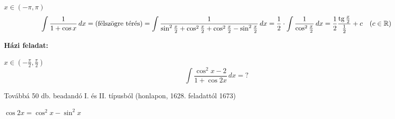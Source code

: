\documentclass[a4paper,11.5pt]{article}
\DeclareMathOperator{\tg}{tg}
\begin{document}
	\begin{task} $x\in(-\pi,\pi)$
		\[\int\frac{1}{1+\cos x}\,dx=\text{(félszögre térés)}=\int\frac{1}{\sin^2\frac{x}{2}+\cos^2\frac{x}{2}+\cos^2\frac{x}{2}-\sin^2\frac{x}{2}}\,dx=\frac{1}{2}\cdot\int\frac{1}{\cos^2\frac{x}{2}}\,dx=\frac{1}{2}\frac{\tg \frac{x}{2}}{\frac{1}{2}}+c\quad (c\in\R) \]
	\end{task}
	\textbf{Házi feladat:}
	\begin{task}$x\in\left(-\frac{\pi}{2},\frac{\pi}{2}\right)$
		\[ \int\frac{\cos^2x-2}{1+\cos2x}\,dx=? \]
	\end{task}
	Továbbá 50 db. beadandó I. és II. típusból (honlapon, 1628. feladattól 1673)
	\begin{revision}
		$\cos2x=\cos^2x-\sin^2x$
	\end{revision}
\end{document}
